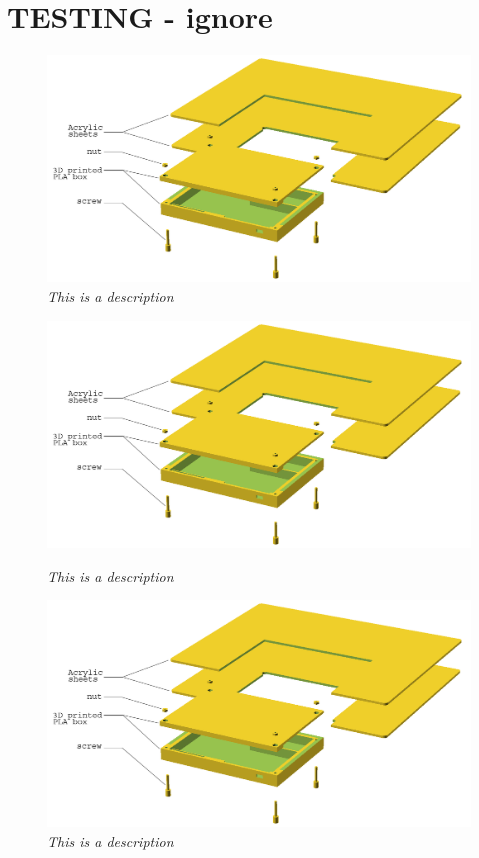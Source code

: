\section{TESTING - ignore}

\begin{figure}[h]
\begin{center}
\includegraphics[scale=0.5]{figures/explode.png}
\caption{\small {\it {This is a description}}} \label{fig:explode}
\end{center}
\end{figure}

\begin{figure}[h]
\begin{minipage}[b]{7.5cm}
\centering
\includegraphics[scale=0.20]{figures/explode.png}
\caption{\small {\it {This is a description}}} \label{fig:testfig1}
\end{minipage}
\hspace{0.5cm}
\begin{minipage}[b]{7.5cm}
\centering
\includegraphics[scale=0.20]{figures/explode.png}
\caption{\small {\it {This is a description}}} \label{fig:testfig2}
\end{minipage}
\end{figure}